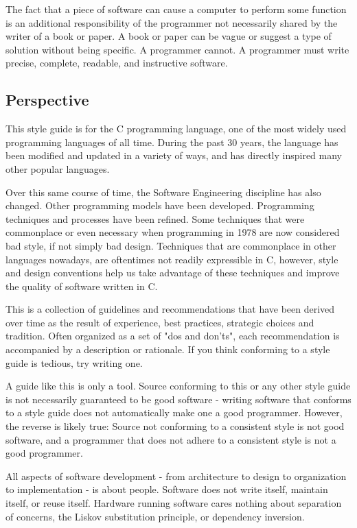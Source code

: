 \documentclass[fleqn,12pt]{PARCOneColumn} %
\begin{document}
The fact that a piece of software can cause a computer to perform some
function is an additional responsibility of the programmer not
necessarily shared by the writer of a book or paper. A book or paper can
be vague or suggest a type of solution without being specific. A
programmer cannot. A programmer must write precise, complete, readable,
and instructive software.

\subsection*{Perspective}\label{perspective}
This style guide is for the C programming language, one of the most widely used programming languages of all time.
During the past 30 years, the language has been modified and updated in a variety of ways, and has directly inspired many other popular languages.

Over this same course of time, the Software Engineering discipline has also changed. Other programming models have been developed.
Programming techniques and processes have been refined. Some techniques that were commonplace or even necessary when programming in 1978 are now considered bad style, if not simply bad design. Techniques that are
commonplace in other languages nowadays, are oftentimes not readily expressible in C, however, style and design conventions help us take advantage of these techniques and improve the quality of software written in C.

This is a collection of guidelines and recommendations that have been derived over time as the result of experience, best practices, strategic choices and tradition. Often organized as a set of "dos and don'ts", each recommendation is accompanied by a description or rationale.
If you think conforming to a style guide is tedious, try writing one.

A guide like this is only a tool.
Source conforming to this or any other
style guide is not necessarily guaranteed to be good software -
writing software that conforms to a style guide does not automatically make one a good programmer.
However, the reverse is likely true:
Source not conforming to a consistent style is not good software, and a programmer that does not adhere to a consistent style is not a good programmer.

All aspects of software development - from architecture to design to organization to implementation - is about people.
Software does not write itself, maintain itself, or reuse itself.
Hardware running software cares nothing about separation of concerns, the Liskov substitution principle, or dependency inversion.
\end{document}
